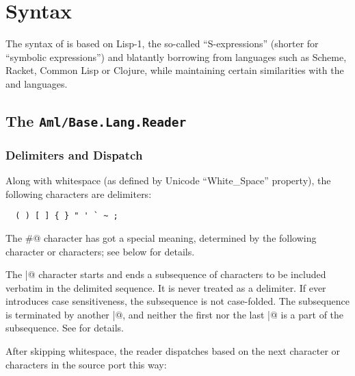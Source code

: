
\chapter{Syntax}
\label{ch:aml-base-syntax}

The syntax of \AmlBase is based on Lisp-1, the so-called ``S-expressions'' (shorter for ``symbolic expressions'') and blatantly borrowing from languages such as Scheme, Racket, Common Lisp or Clojure, while maintaining certain similarities with the \Aml and \AmlCore languages. 




\section[The Aml/Base.Lang.Reader]{The \lstinline!Aml/Base.Lang.Reader!}
\label{sec:aml-base-lang-reader}




\subsection{Delimiters and Dispatch}
\label{subsec:aml-base-lang-reader-delimiters-dispatch}

Along with whitespace (as defined by Unicode ``White\_Space'' property), the following characters are delimiters:

\begin{lstlisting}
  ( ) [ ] { } " ' ` ~ ;
\end{lstlisting}

The \lstinline@#@ character has got a special meaning, determined by the following character or characters; see below for details.

The \lstinline@|@ character starts and ends a subsequence of characters to be included verbatim in the delimited sequence. It is never treated as a delimiter. If \AmlBase ever introduces case sensitiveness, the subsequence is not case-folded. The subsequence is terminated by another \lstinline@|@, and neither the first nor the last \lstinline@|@ is a part of the subsequence. See  for details.

After skipping whitespace, the \AmlBase reader dispatches based on the next character or characters in the source port this way:


